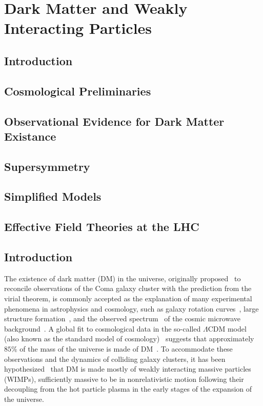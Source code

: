 \section{Dark Matter and Weakly Interacting Particles}
\subsection{Introduction}
\subsection{Cosmological Preliminaries}
\subsection{Observational Evidence for Dark Matter Existance}
\subsection{Supersymmetry}
\subsection{Simplified Models}
\subsection{Effective Field Theories at the LHC}
\subsection{Introduction}

The existence of dark matter (DM) in the universe, originally proposed~\cite{Zwicky:1937zza} to
reconcile observations of the Coma galaxy cluster with
the prediction from the virial theorem, is 
commonly accepted as the explanation of many experimental
phenomena in astrophysics and cosmology, such as galaxy rotation
curves~\cite{vandeHulst,Rubin:1980zd}, large structure
formation~\cite{White:1987yr,Carlberg:1989yr,Springel:2005nw}, and the
observed
spectrum~\cite{Smoot:1992td,deBernardis:2000gy,Spergel:2006hy,Ade:2013zuv}
of the cosmic microwave background~\cite{Bardeen:1985tr}. A global fit to
cosmological data in the so-called $\Lambda$CDM model (also known as
the standard model of cosmology)~\cite{Cen:2000xv} suggests that
approximately $85\%$ of the mass of the universe is made of
DM~\cite{Ade:2013zuv}. To accommodate these observations and the
dynamics of colliding galaxy clusters, it has been
hypothesized~\cite{Clowe:2006eq} that DM is made mostly of weakly
interacting massive particles
(WIMPs), sufficiently massive to be in nonrelativistic motion
following their decoupling from the hot particle plasma in the early
stages of the expansion of the universe.

